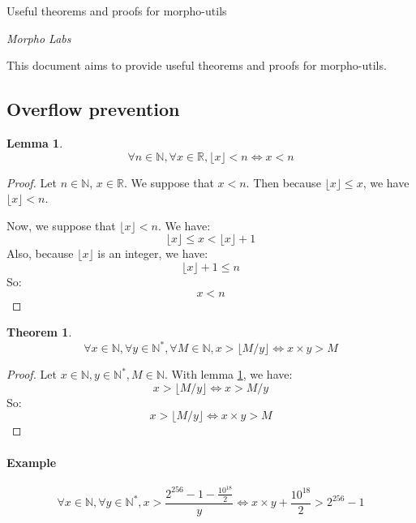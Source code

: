 \documentclass[12pt]{article}
\newtheorem{theorem}{Theorem}
\newtheorem{lemma}{Lemma}
\begin{document}
\begin{center}
    \Large Useful theorems and proofs for morpho-utils
    \vspace{1\baselineskip}

    \normalsize \textit{Morpho Labs}
\end{center}

\vspace{2\baselineskip}

This document aims to provide useful theorems and proofs for morpho-utils.

\subsection*{Overflow prevention}

\begin{lemma} \label{lemma-1}
    \[\forall n\in\mathbb{N}, \forall x\in\mathbb{R}, \lfloor x\rfloor<n \Leftrightarrow x<n\]
\end{lemma}

\begin{proof}
    Let $n\in\mathbb{N}$, $x\in\mathbb{R}$.
    We suppose that $x<n$. Then because $\lfloor x\rfloor\leq x$, we have $\lfloor x\rfloor<n$.
    
    Now, we suppose that $\lfloor x\rfloor<n$. We have:
    \[\lfloor x\rfloor\leq x<\lfloor x\rfloor+1\]
    Also, because $\lfloor x\rfloor$ is an integer, we have:
    \[\lfloor x\rfloor+1\leq n\]
    So:
    \[x<n\]
\end{proof}    

\begin{theorem}
    \[\forall x\in\mathbb{N}, \forall y\in\mathbb{N}^*, \forall M\in\mathbb{N}, x>\lfloor M/y \rfloor \Leftrightarrow x\times y>M\]
\end{theorem}

\begin{proof}
    Let $x\in\mathbb{N}, y\in\mathbb{N}^*, M\in\mathbb{N}$. With lemma \ref{lemma-1}, we have:
    \[x > \lfloor M/y \rfloor \Leftrightarrow x > M/y\]
    So:
    \[x > \lfloor M/y \rfloor \Leftrightarrow x \times y > M\]
\end{proof}

\paragraph{Example}

\[\forall x\in\mathbb{N}, \forall y\in\mathbb{N}^*, x>\frac{2^{256}-1-\frac{10^{18}}{2}}{y} \Leftrightarrow x \times y + \frac{10^{18}}{2} > 2^{256}-1\]
\end{document}
